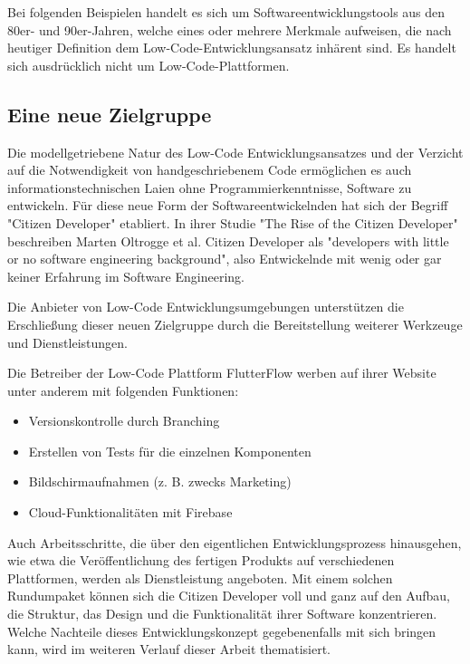 \documentclass[acmtog, language=ngerman]{acmart}
\begin{document}
Bei folgenden Beispielen handelt es sich um Softwareentwicklungstools aus den 80er- und 90er-Jahren, welche eines oder mehrere Merkmale aufweisen, die nach heutiger Definition dem Low-Code-Entwicklungsansatz inhärent sind. Es handelt sich ausdrücklich nicht um Low-Code-Plattformen.

\subsection{Eine neue Zielgruppe}
Die modellgetriebene Natur des Low-Code Entwicklungsansatzes und der Verzicht auf die Notwendigkeit von handgeschriebenem Code ermöglichen es auch informationstechnischen Laien ohne Programmierkenntnisse, Software zu entwickeln. Für diese neue Form der Softwareentwickelnden hat sich der Begriff "Citizen Developer" etabliert. In ihrer Studie "The Rise of the Citizen Developer" beschreiben Marten Oltrogge et al. Citizen Developer als "developers with little or no software engineering background", also Entwickelnde mit wenig oder gar keiner Erfahrung im Software Engineering. \cite{oltrogge_2018}

Die Anbieter von Low-Code Entwicklungsumgebungen unterstützen die Erschließung dieser neuen Zielgruppe durch die Bereitstellung weiterer Werkzeuge und Dienstleistungen. \cite{low_code_vs_mdd}

Die Betreiber der Low-Code Plattform FlutterFlow werben auf ihrer Website unter anderem mit folgenden Funktionen: \cite{flutterflow_features}

\begin{itemize}
    \item Versionskontrolle durch Branching
    \item Erstellen von Tests für die einzelnen Komponenten
    \item Bildschirmaufnahmen (z. B. zwecks Marketing)
    \item Cloud-Funktionalitäten mit Firebase
\end{itemize}

Auch Arbeitsschritte, die über den eigentlichen Entwicklungsprozess hinausgehen, wie etwa die Veröffentlichung des fertigen Produkts auf verschiedenen Plattformen, werden als Dienstleistung angeboten.\cite{flutterflow_deployment} Mit einem solchen Rundumpaket können sich die Citizen Developer voll und ganz auf den Aufbau, die Struktur, das Design und die Funktionalität ihrer Software konzentrieren. Welche Nachteile dieses Entwicklungskonzept gegebenenfalls mit sich bringen kann, wird im weiteren Verlauf dieser Arbeit thematisiert.
\end{document}
